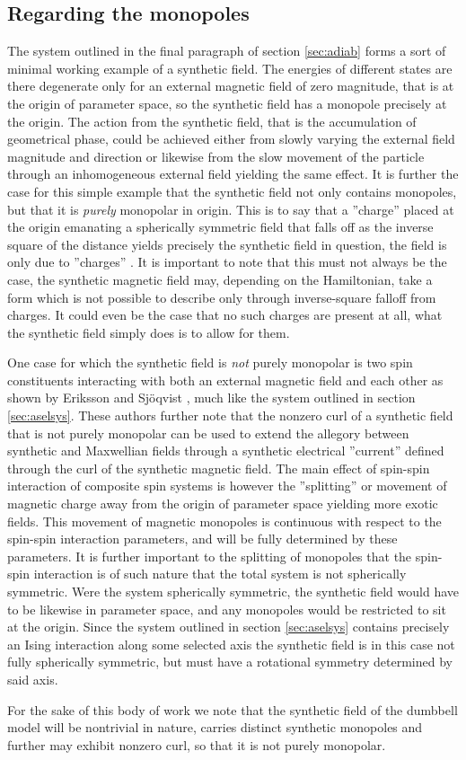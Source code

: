 \documentclass[main.tex]{subfiles}
\begin{document}
\subsection{Regarding the monopoles}\label{sec:regmono}
The system outlined in the final paragraph of section \ref{sec:adiab} forms a sort of minimal working example of a
synthetic field. The energies of different states are there degenerate only for an
external magnetic field of zero magnitude, that is at the origin of parameter space, so the
synthetic field has a monopole precisely at the origin. The action from the synthetic
field, that is the accumulation of geometrical phase, could be achieved either from slowly
varying the external field magnitude and direction or likewise from the slow movement of the
particle through an inhomogeneous external field yielding the same effect. It is further
the case for this simple example that the synthetic field not only contains monopoles, but
that it is \textit{purely} monopolar in origin. This is to say that a ''charge'' placed at
the origin emanating a spherically symmetric field that falls off as the inverse square of the distance yields
precisely the synthetic field in question, the field is only due to
''charges'' \cite{berry1984}. It is important to note that this must not
always be the case, the synthetic magnetic field may, depending on the Hamiltonian, take a
form which is not possible to describe only through inverse-square falloff from 
charges. It could even be the case that no such charges are present at all, what the
synthetic field simply does is to allow for them. %

One case for which the synthetic field is \textit{not} purely monopolar is two spin
constituents interacting with both an external magnetic field and each other as shown by Eriksson and Sjöqvist
\cite{eriksson}, much like the system outlined in section \ref{sec:aselsys}. These authors further note that the nonzero curl of a synthetic field that is not purely
monopolar can be used to extend the allegory between synthetic and Maxwellian 
fields through a synthetic electrical ''current'' defined through the curl of the synthetic
magnetic field. The main
effect of spin-spin interaction of composite spin systems is however the ''splitting'' or
movement of magnetic charge away from the origin of parameter space yielding more exotic fields. This movement of magnetic monopoles is continuous
with respect to the spin-spin interaction parameters, and will be fully determined by these
parameters. It is further important to the splitting of monopoles that the spin-spin interaction is of
such nature that the total system is not spherically symmetric. Were the system spherically
symmetric, the synthetic field would have to be likewise in parameter space, and any
monopoles would be restricted to sit at the origin. Since the system outlined in section
\ref{sec:aselsys} contains precisely an Ising interaction along some selected axis the
synthetic field is in this case not fully spherically symmetric, but must have a rotational symmetry
determined by said axis. 

For the sake of this body of work we note that the synthetic field of the dumbbell
model will be nontrivial
in nature, carries distinct synthetic monopoles and further may exhibit nonzero curl, so
that it is not purely monopolar.
\end{document}
